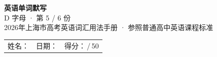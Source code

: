 \documentclass[10pt,a4paper]{article}
\begin{document}
\pagestyle{plain}

\begin{center}
{\LARGE\bfseries 英语单词默写}\\[0.22em]
{\large D 字母 · 第 5 / 6 份}\\[0.18em]
{\small 2026年上海市高考英语词汇用法手册 · 参照普通高中英语课程标准}
\end{center}

\vspace{0.25em}
\noindent\begin{tabular}{@{}p{}@{}p{}@{}p{}@{}}
姓名：\underline{\hspace{2.0cm}} & 日期：\underline{\hspace{2.0cm}} & 得分：\underline{\hspace{1.3cm}}\,/\,50 \\
\end{tabular}

\vspace{0.3em}

\vspace{0.08em}
\end{document}
